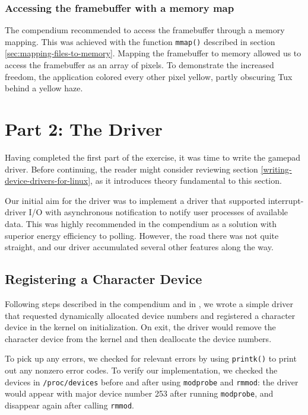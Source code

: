 
\subsubsection{Accessing the framebuffer with a memory map}
The compendium recommended to access the framebuffer through a memory mapping. This was achieved with the function \texttt{mmap()} described in section \ref{sec:mapping-files-to-memory}. Mapping the framebuffer to memory allowed us to access the framebuffer as an array of pixels. To demonstrate the increased freedom, the application colored every other pixel yellow, partly obscuring Tux behind a yellow haze.


\section{Part 2: The Driver}
Having completed the first part of the exercise, it was time to write the gamepad driver. Before continuing, the reader might consider reviewing section \ref{writing-device-drivers-for-linux}, as it introduces theory fundamental to this section.

Our initial aim for the driver was to implement a driver that supported interrupt-driver I/O with asynchronous notification to notify user processes of available data. This was highly recommended in the compendium as a solution with superior energy efficiency to polling. However, the road there was not quite straight, and our driver accumulated several other features along the way.

\subsection{Registering a Character Device}
Following steps described in the compendium and in \cite{linux-device-drivers}, we wrote a simple driver that requested dynamically allocated device numbers and registered a character device in the kernel on initialization. On exit, the driver would remove the character device from the kernel and then deallocate the device numbers.

To pick up any errors, we checked for relevant errors by using \texttt{printk()} to print out any nonzero error codes. To verify our implementation, we checked the devices in \texttt{/proc/devices} before and after using \texttt{modprobe} and \texttt{rmmod}: the driver would appear with major device number 253 after running \texttt{modprobe}, and disappear again after calling \texttt{rmmod}.

